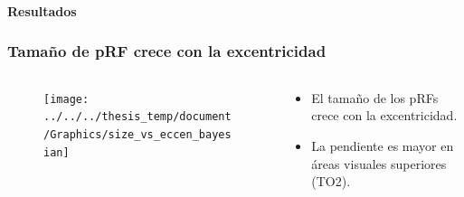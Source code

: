 \documentclass[
11pt, %
%
aspectratio=169, %
]{beamer}
\begin{document}
	\begin{frame}
		\frametitle{}
		\centering
	 	\textbf{ \Huge{Resultados}}
	\end{frame}
	\begin{frame}
		\frametitle{Tama\~no de pRF crece con la excentricidad}
		
		\begin{columns}[t] %
			
			
			\begin{column}{0.7\textwidth}
				\begin{figure}
					\centering
				\texttt{[image: ../../../thesis\_temp/document/Graphics/size\_vs\_eccen\_bayesian]}
				\end{figure}
			\end{column}
		
			\begin{column}{0.3\textwidth} %
				\begin{itemize}
					\item El tama\~no de los pRFs crece con la excentricidad.
					\item La pendiente es mayor en \'areas visuales superiores (TO2).
					
				\end{itemize}
				
				
				
			\end{column}					
			
		\end{columns}
		
	\end{frame}
	
\end{document}

